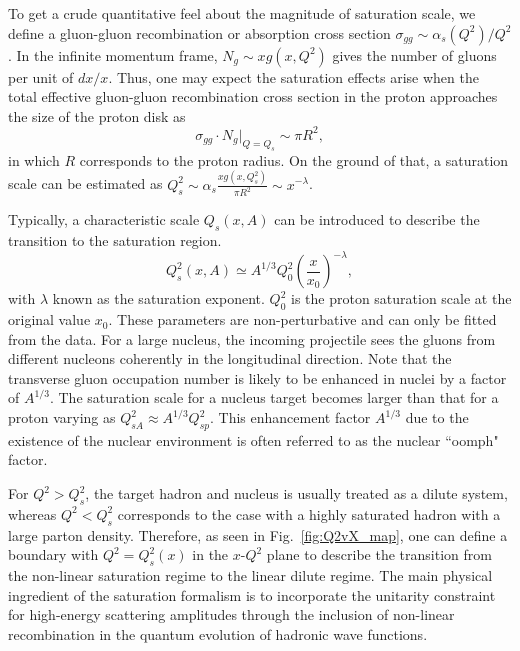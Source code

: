 To get a crude quantitative feel about the magnitude of saturation scale, 
we define a gluon-gluon recombination or absorption cross section \(\sigma_{gg}\sim\alpha_{s}(Q^{2})/Q^{2}\).
In the infinite momentum frame, $N_{g}\sim xg(x,Q^{2})$ gives the number of gluons per unit of $dx/x$.
Thus, one may expect the saturation effects arise when the total effective gluon-gluon recombination
cross section in the proton approaches the size of the proton disk as
\[\sigma_{gg} \cdot N_{g}|_{Q=Q_{s}} \sim \pi R^{2},  \]
in which $R$ corresponds to the proton radius. On the ground of that,
a saturation scale can be estimated as $Q^{2}_{s}\sim \alpha_{s}\frac{xg(x,Q^{2}_{s})}{\pi R^{2}}\sim x^{-\lambda}$.

Typically, a characteristic scale $Q_{s}(x,A)$ can
be introduced to describe the transition to the saturation region. 
\begin{equation}
Q^{2}_{s}(x,A)\simeq A^{1/3} Q^{2}_{0}(\frac{x}{x_{0}})^{-\lambda},
\label{eqn:sat_scale}
\end{equation}
with $\lambda$ known as the saturation exponent. $Q^{2}_{0}$ is the proton
saturation scale at the original value $x_{0}$. These parameters are
non-perturbative and can only be fitted from the data. 
For a large nucleus, the incoming projectile sees the gluons from different nucleons coherently in the longitudinal direction. Note that the transverse gluon occupation number is likely to be enhanced in nuclei by a factor of $A^{1/3}$.
The saturation scale for a nucleus target becomes larger than that for a proton varying as
$Q_{sA}^{2}\approx A^{1/3}Q^{2}_{sp}$. This enhancement factor $A^{1/3}$ due to
the existence of the nuclear environment is often referred to as the nuclear
``oomph" factor.

For $Q^{2}>Q_{s}^{2}$, the target hadron and nucleus is usually treated as a dilute system,
whereas $Q^{2}<Q_{s}^{2}$ corresponds to the case with a highly saturated
hadron with a large parton density. Therefore, as seen in
Fig.~\ref{fig:Q2vX_map}, one can define a boundary with $Q^2=Q_s^2(x)$ in the
$x\textrm{-}Q^2$ plane to describe the transition from the non-linear saturation
regime to the linear dilute regime. The main physical ingredient of the
saturation formalism is to incorporate the unitarity constraint for high-energy
scattering amplitudes through the inclusion of non-linear recombination in the
quantum evolution of hadronic wave functions.



